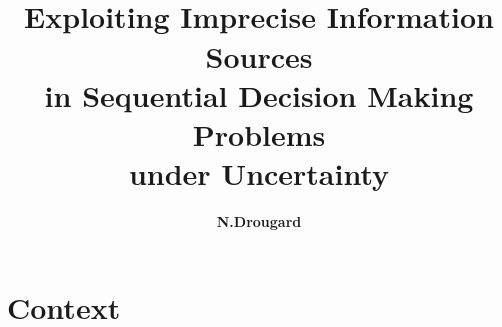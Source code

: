 \documentclass[12pt,svgnames,table]{beamer}
\title{
\vspace{0.7cm}\\
Exploiting Imprecise Information Sources\\
in Sequential Decision Making Problems\\
under Uncertainty}
\author{\vspace{0.1cm} \textbf{N.Drougard}}
\newcommand{\nico}[1]{ }
\begin{document}
{
\begin{frame}[plain]
	\titlepage
\end{frame}
}

\nico{
\section*{}
\begin{frame}
  \frametitle{Overview}
  \tableofcontents[section=1,hidesubsections]
\end{frame}

\AtBeginSection[]
{
  \frame<handout:0>
  {
    \frametitle{Overview}
    \tableofcontents[currentsection,hideallsubsections]
  }
}

\AtBeginSubsection[]
{
  \frame<handout:0>
  {
    \frametitle{Overview}
    \tableofcontents[sectionstyle=show/hide,subsectionstyle=show/shaded/hide]
  }
}
}

\section[context]{Context}
\end{document}
